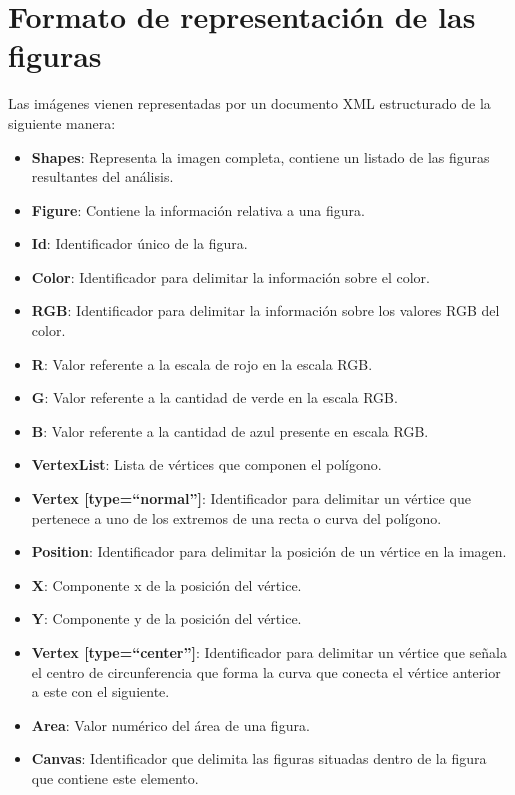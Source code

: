 \section{Formato de representación de las figuras}

Las imágenes vienen representadas por un documento XML  estructurado de la siguiente manera:

\begin{itemize}
\item \textbf{Shapes}: Representa la imagen completa, contiene un listado de las figuras resultantes del análisis.
\item \textbf{Figure}: Contiene la información relativa a una figura.
\item \textbf{Id}: Identificador único de la figura.
\item \textbf{Color}: Identificador para delimitar la información sobre el color.
\item \textbf {RGB}: Identificador para delimitar la información sobre los valores RGB del color.
\item \textbf{R}: Valor referente a la escala de rojo en la escala RGB.
\item \textbf{G}: Valor referente a la cantidad de verde en la escala RGB.
\item \textbf{B}: Valor referente a la cantidad de azul presente en escala RGB.
\item \textbf{VertexList}: Lista de vértices que componen el polígono.
\item \textbf{Vertex [type=``normal'']}: Identificador para delimitar un vértice que pertenece a uno de los extremos de una recta o curva del polígono.
\item \textbf{Position}: Identificador para delimitar la posición de un vértice en la imagen.
\item \textbf{X}: Componente x de la posición del vértice.
\item \textbf{Y}: Componente y de la posición del vértice.
\item \textbf{Vertex [type=``center'']}: Identificador para delimitar un vértice que señala el centro de circunferencia que forma la curva que conecta el vértice anterior a este con el siguiente.
\item \textbf{Area}: Valor numérico del área de una figura.
\item \textbf{Canvas}: Identificador que delimita las figuras situadas dentro de la figura que contiene este elemento. 
\end{itemize}

